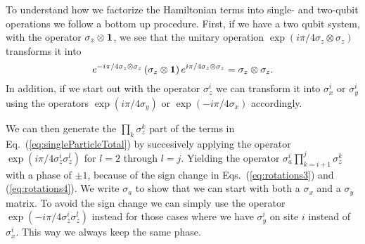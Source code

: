 To understand how we factorize the Hamiltonian terms into single- and
two-qubit operations we follow a bottom up procedure.
First, 
if we have a two qubit system, with the operator $\sigma_z \otimes
{\bf 1}$, we see that the unitary operation $\exp(i\pi/4 \sigma_z\otimes
\sigma_z)$  transforms it into
\begin{equation}
e^{-i\pi/4 \sigma_z\otimes\sigma_z}\left( \sigma_z\otimes{\bf 1} \right)
e^{i\pi/4 \sigma_z\otimes\sigma_z} = \sigma_z\otimes\sigma_z.
\end{equation} 
In addition, if we start out with the operator $\sigma_z^i$ we can transform it
into $\sigma_x^i$ or $\sigma_y^i$ using the operators
$\exp(i\pi/4\sigma_y)$ or $\exp(-i\pi/4\sigma_x)$ accordingly. 

We can then generate the $\prod_k \sigma_z^k$ part of the terms in
Eq.~(\ref{eq:singleParticleTotal}) by succesively
applying the operator $\exp(i\pi/4\sigma_z^i \sigma_z^l)$ for $l=2$
through $l=j$. Yielding the operator $\sigma_a^i \prod_{k=i+1}^{j}
\sigma_z^k$ with a phase of $\pm1$, because of the sign change in
Eqs.~(\ref{eq:rotations3}) and (\ref{eq:rotations4}). We write
$\sigma_a$ to show that we can start with both a $\sigma_x$ and
a $\sigma_y$ matrix. To avoid the sign
change we can simply use the operator $\exp(-i\pi/4\sigma_z^i
\sigma_z^l)$ instead for those cases where  we have $\sigma_y^i$ on site
$i$ 
instead of $\sigma_x^i$. This way we always keep the same phase.

